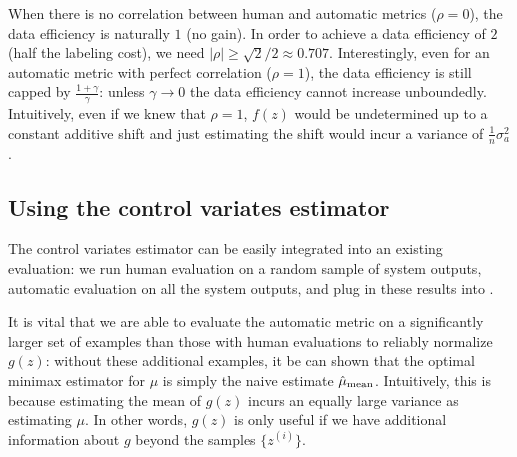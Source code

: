 When there is no correlation between human and automatic metrics ($\rho = 0$),
the data efficiency is naturally $1$ (no gain).
In order to achieve a data efficiency of
$2$ (half the labeling cost), we need $|\rho| \geq \sqrt{2}/2 \approx 0.707$.
Interestingly, even for an automatic metric with perfect correlation ($\rho=1$),
the data efficiency is still capped by $\frac{1 + \gamma}{\gamma}$:
unless $\gamma \to 0$ the data efficiency cannot increase unboundedly.
Intuitively, even
if we knew that $\rho=1$, $f(z)$ would be undetermined up to a
constant additive shift and just estimating the shift would incur a variance of $\frac{1}{n} \sigma_a^2$.




\subsection{Using the control variates estimator}
The control variates estimator can be easily integrated into an existing evaluation:
we run human evaluation on a random sample of system outputs, automatic evaluation on all the system outputs, and plug in these results into .

It is vital that we are able to evaluate the automatic metric on a significantly larger set of examples than those with human evaluations to reliably normalize $g(z)$:
without these additional examples, it be can shown that the optimal minimax estimator for $\mu$ is simply the naive estimate $\hat \mu_\text{mean}$.
Intuitively, this is because estimating the mean of $g(z)$ incurs an equally large variance as estimating $\mu$.
In other words, $g(z)$ is only useful if we have additional information about $g$ beyond the samples $\{z^{(i)}\}$.

